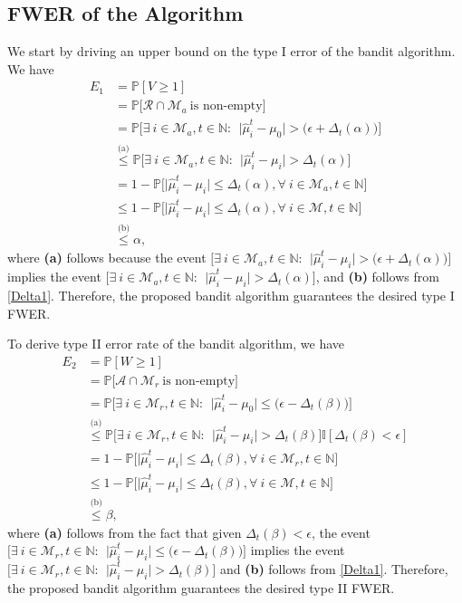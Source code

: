 \documentclass[12pt]{article}
\def\P{\mathbb{P}}
\def\N{\mathbb{N}}
\def\N{\mathbb{N}}
\def\MM{\mathcal{M}}
\def\RR{\mathcal{R}}
\def\AA{\mathcal{A}}
\begin{document}
\subsection{FWER of the Algorithm}
We start by driving an upper bound on the type I error of the bandit algorithm. We have
\begin{equation}
\label{analysis1}
\begin{aligned}
E_1 &= \P[V \geq 1]\\
& = \P\big[\RR\cap\MM_a~\mbox{is non-empty}\big]\\
& = \P\Big[\exists~i\in\MM_a,t\in\mathbb{N}: ~~\big| \hat\mu^t_i - \mu_0\big|>\big(\epsilon+ \Delta_t(\alpha)\big)\Big]\\
&\stackrel{\text{(a)}}{\leq} \P\Big[\exists~i\in\MM_a,t\in\mathbb{N}: ~~\big| \hat\mu^t_i - \mu_i\big|>\Delta_t(\alpha)\Big]\\
& = 1 - \P\Big[\big| \hat\mu^t_i - \mu_i\big|\leq\Delta_t(\alpha),\forall~i\in\MM_a,t\in\mathbb{N}\Big]\\
&\leq 1 - \P\Big[\big| \hat\mu^t_i - \mu_i\big|\leq\Delta_t(\alpha),\forall~i\in\MM,t\in\mathbb{N}\Big]\\
&\stackrel{\text{(b)}}{\leq}\alpha,
\end{aligned}
\end{equation}
where {\bf (a)} follows because the event $\Big [\exists~i\in\MM_a,t\in\mathbb{N}: ~~\big| \hat\mu^t_i - \mu_i\big|>\big(\epsilon+ \Delta_t(\alpha)\big)\Big]$ implies the event $\Big[\exists~i\in\MM_a,t\in\mathbb{N}: ~~\big| \hat\mu^t_i - \mu_i\big|>\Delta_t(\alpha)\Big] $, and {\bf (b)} follows from \eqref{Delta1}. Therefore, the proposed bandit algorithm guarantees the desired type I FWER. 

To derive type II error rate of the bandit algorithm, we have
\begin{equation}
\label{analysis2}
\begin{aligned}
E_2 &= \P[W\geq 1]\\
& = \P\big[\AA\cap\MM_r~\mbox{is non-empty}\big]\\
& = \P\Big[\exists~i\in\MM_r,t\in\N:~~\big| \hat\mu^t_i - \mu_0\big|\leq\big(\epsilon- \Delta_t(\beta)\big)\Big]\\
& \stackrel{\text{(a)}}{\leq} \P\Big[\exists~i\in\MM_r,t\in\N:~~\big| \hat\mu^t_i - \mu_i\big|> \Delta_t(\beta)\Big]\mathbb{I}[\Delta_t(\beta)<\epsilon]\\
& = 1 - \P\Big[\big| \hat\mu^t_i - \mu_i\big|\leq\Delta_t(\beta),\forall~i\in\MM_r,t\in\mathbb{N}\Big]\\
& \leq 1 - \P\Big[\big| \hat\mu^t_i - \mu_i\big|\leq\Delta_t(\beta),\forall~i\in\MM,t\in\mathbb{N}\Big]\\
&\stackrel{\text{(b)}}{\leq} \beta,
\end{aligned}
\end{equation}
where {\bf (a)} follows from the fact that given $\Delta_t(\beta)<\epsilon$, 
the event $\Big[\exists~i\in\MM_r,t\in\N:~~\big| \hat\mu^t_i - \mu_i\big|\leq\big(\epsilon- \Delta_t(\beta)\big)\Big]$ implies the event $\Big[\exists~i\in\MM_r,t\in\N:~~\big| \hat\mu^t_i - \mu_i\big|> \Delta_t(\beta)\Big]$ and {\bf (b)}  follows from \eqref{Delta1}. Therefore, the proposed bandit algorithm guarantees the desired  type II FWER.  
\end{document}
